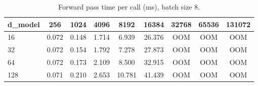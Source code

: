 \begin{table}
\centering
\begin{tabular}{lcccccccc}
\toprule
d\_model & 256 & 1024 & 4096 & 8192 & 16384 & 32768 & 65536 & 131072 \\
\midrule
16 & 0.072 & 0.148 & 1.714 & 6.939 & 26.376 & OOM & OOM & OOM \\
32 & 0.072 & 0.154 & 1.792 & 7.278 & 27.873 & OOM & OOM & OOM \\
64 & 0.072 & 0.173 & 2.109 & 8.500 & 32.915 & OOM & OOM & OOM \\
128 & 0.071 & 0.210 & 2.653 & 10.781 & 41.439 & OOM & OOM & OOM \\
\bottomrule
\end{tabular}
\caption{Forward pass time per call (ms), batch size 8.}
\label{tab:attn_forward_ms}
\end{table}
